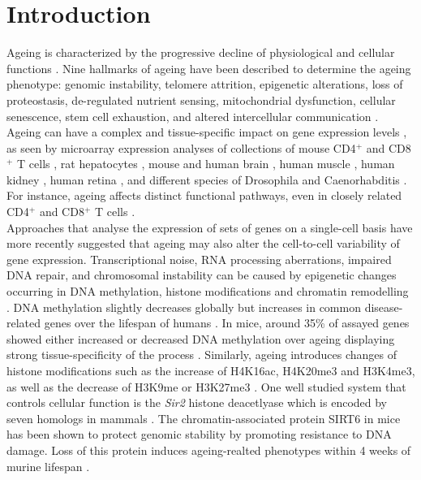 
\section{Introduction}

Ageing is characterized by the progressive decline of physiological and cellular functions \citep{Lopez-Otin2013, Booth2016}. Nine hallmarks of ageing have been described to determine the ageing phenotype: genomic instability, telomere attrition, epigenetic alterations, loss of proteostasis, de-regulated nutrient sensing, mitochondrial dysfunction, cellular senescence, stem cell exhaustion, and altered intercellular communication \citep{Lopez-Otin2013}. Ageing can have a complex and tissue-specific impact on gene expression levels \citep{Zahn2007}, as seen by microarray expression analyses of collections of mouse CD4$^+$ and CD8$^+$ T cells \citep{Mirza2011}, rat hepatocytes \citep{Tollet-Egnell2000}, mouse and human brain \citep{Lu2004, Lee2000}, human muscle \citep{Welle2003, Zahn2006}, human kidney \citep{Rodwell2004}, human retina \citep{Yoshida2002}, and different species of Drosophila and Caenorhabditis \citep{Mccarroll2004}. For instance, ageing affects distinct functional pathways, even in closely related CD4$^+$ and CD8$^+$ T cells \citep{Mirza2011}. \\

Approaches that analyse the expression of sets of genes on a single-cell basis have more recently suggested that ageing may also alter the cell-to-cell variability of gene expression. Transcriptional noise, RNA processing aberrations, impaired DNA repair, and chromosomal instability can be caused by epigenetic changes occurring in DNA methylation, histone modifications and chromatin remodelling \citep{Lopez-Otin2013}. DNA methylation slightly decreases globally but increases in common disease-related genes over the lifespan of humans \citep{Talens2012}. In mice, around 35\% of assayed genes showed either increased or decreased DNA methylation over ageing displaying strong tissue-specificity of the process \citep{Maegawa2010}. Similarly, ageing introduces changes of histone modifications such as the increase of H4K16ac, H4K20me3 and H3K4me3, as well as the decrease of H3K9me or H3K27me3 \citep{Han2012, Fraga2007}. One well studied system that controls cellular function is the \emph{Sir2} histone deacetlyase which is encoded by seven homologs in mammals \citep{Houtkooper2016}. The chromatin-associated protein SIRT6 in mice has been shown to protect genomic stability by promoting resistance to DNA damage. Loss of this protein induces ageing-realted phenotypes within 4 weeks of murine lifespan \cite{Mostoslavsky2006}.\\

